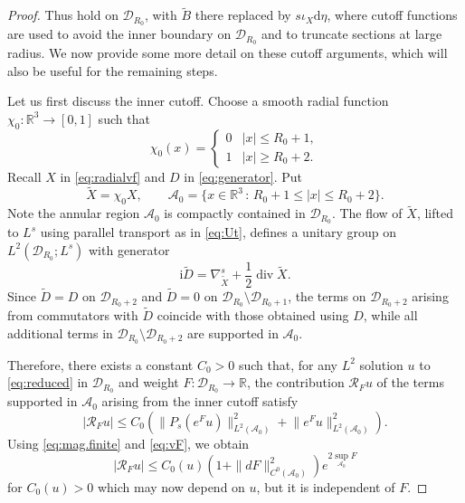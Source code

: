 \documentclass{article}
\theoremstyle{definition}
\numberwithin{thm}{section}
\numberwithin{equation}{section}
\def\R{\mathbb{R}}
\newcommand{\ii}{\mathrm i}
\newcommand{\dd}{\mathrm d}
\newcommand{\norm}[1]{\lVert #1\rVert}
\begin{document}
\begin{proof}
Thus \cite[Lemmas 3.16, 3.18 and 3.19]{AHK} hold on $\mathcal{D}_{R_0}$, with $\tilde{B}$ there replaced by $s\iota_X\dd\eta$, where cutoff functions are used to avoid the inner boundary on $\mathcal{D}_{R_0}$ and to truncate sections at large radius. We now provide some more detail on these cutoff arguments, which will also be useful for the remaining steps.  


Let us first discuss the inner cutoff. Choose a smooth radial function $\chi_0:\R^3\to [0,1]$ such that
\begin{equation}
    \chi_0(x)=\left\{\begin{array}{cl} 0 & |x|\leq R_0+1,\\ 
    1 & |x|\geq R_0+2. \end{array}\right.
\end{equation}
 Recall $X$ in \eqref{eq:radialvf} and  $D$ in \eqref{eq:generator}.  Put
\begin{equation}\label{eq:cutoff.inner}
    \widetilde{X}=\chi_0 X,
\qquad
\mathcal{A}_0=\{x\in\R^3\,:\,R_0+1\leq |x|\leq R_0+2\}.
\end{equation}
Note the annular region $\mathcal{A}_0$ is compactly contained in $\mathcal{D}_{R_0}$. The flow of $\widetilde X$, lifted to $L^s$ using parallel transport as in \eqref{eq:Ut}, defines a unitary group on $L^2 \left(\mathcal{D}_{R_0}; L^s\right)$ with generator
\begin{equation}\label{eq:tilde.D}
    \ii\widetilde D
       =\nabla^s_{\widetilde X}
        +\frac12\operatorname{div}\widetilde X.
\end{equation}
 Since $\widetilde D = D$   on $\mathcal{D}_{R_0+2}$ and $\widetilde D = 0$ on $\mathcal{D}_{R_0} \setminus \mathcal{D}_{R_0+1}$, the terms on $\mathcal{D}_{R_0+2}$ arising from commutators with $\tilde{D}$ coincide with those obtained using $D$, while all additional terms in $\mathcal{D}_{R_0}\setminus\mathcal{D}_{R_0+2}$ are supported in $\mathcal{A}_0$.

 Therefore, there exists a constant $C_0>0$ such that, for any $L^2$ solution $u$ to \eqref{eq:reduced} in $\mathcal{D}_{R_0}$ and weight $F:\mathcal{D}_{R_0}\to\R$, 
 the contribution $\mathcal{R}_Fu$ of the terms supported in $\mathcal{A}_0$ arising from the inner cutoff satisfy
\begin{equation}
    |\mathcal R_Fu|
    \leq C_0\left(
       \norm{P_s(e^Fu)}_{L^2(\mathcal{A}_0)}^2
       +\norm{e^Fu}_{L^2(\mathcal{A}_0)}^2
    \right).
\end{equation}
Using \eqref{eq:mag.finite} and \eqref{eq:vF}, we obtain
\begin{equation} \label{eq:fixed-remainder}
    |\mathcal R_Fu| \leq C_0(u) \left(1+\|dF\|_{C^0(\mathcal{A}_0)}^2\right) e^{2\sup_{\mathcal{A}_0}\! F}
\end{equation}
for $C_0(u)>0$ which may now depend on $u$, but it is independent of $F$.


\end{proof}
\end{document}
